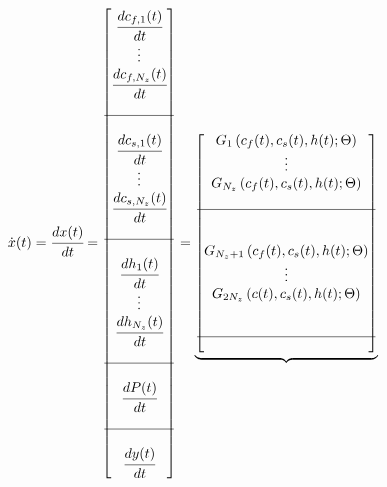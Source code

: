 \documentclass[../Article_Sensitivity_Analsysis.tex]{subfiles}
\begin{document}
			{\footnotesize
				\begin{align*} \label{discretization}
					\dot{{\color{black}x}}(t) &= \cfrac{d {\color{black}x}(t)}{d t} = 
					\begin{bmatrix}
						\cfrac{d {\color{black}c_{f,1}}(t)}{d t} 	  \\
						\vdots					  \\
						\cfrac{d {\color{black}c_{f,N_z}}(t)}{d t} \\
						\\ \hline \\
						\cfrac{d {\color{black}c_{s,1}}(t)}{d t} 	  \\
						\vdots					  \\
						\cfrac{d {\color{black}c_{s,N_z}}(t)}{d t} \\
						\\ \hline \\
						\cfrac{d {\color{black}h_1}(t)}{d t} 	  \\
						\vdots 					  \\
						\cfrac{d {\color{black}h_{N_z}}(t)}{d t} \\
						\\ \hline \\
						\cfrac{d {\color{black}P}(t)}{d t} \\
						\\ \hline \\
						\cfrac{d {\color{black}y}(t)}{d t}
					\end{bmatrix}
					=
					\underbrace{\begin{bmatrix}
							{\color{black}G_1} \left( {\color{black}c_f}(t),{\color{black}c_s}(t),{\color{black}h}(t); {\color{black}\Theta} \right)\\ 
							\vdots\\ 
							{\color{black}G_{N_z}} \left( {\color{black}c_f}(t),{\color{black}c_s}(t),{\color{black}h}(t); {\color{black}\Theta} \right)\\ 
							\\ \hline \\ \\
							{\color{black}G_{N_z+1}} \left( {\color{black}c_f}(t),{\color{black}c_s}(t),{\color{black}h}(t); {\color{black}\Theta} \right)\\ 
							\vdots\\
							{\color{black}G_{2N_z}} \left( {\color{black}c}(t),{\color{black}c_s}(t),{\color{black}h}(t); {\color{black}\Theta} \right)\\ 
							\\ \\ \hline \\ 

\end{bmatrix}}
\end{align*}}
\end{document}
